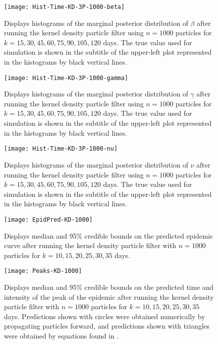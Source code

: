 \documentclass{article}
\begin{document}
\begin{figure}[ht]
\texttt{[image: Hist-Time-KD-3P-1000-beta]}
\caption{Displays histograms of the marginal posterior distribution of $\beta$ after running the kernel density particle filter using $n = 1000$ particles for $k = 15,30,45,60,75,90,105,120$ days.  The true value used for simulation is shown in the subtitle of the upper-left plot represented in the histograms by black vertical lines.} \label{fig:histbeta}
\end{figure}

\begin{figure}[ht]
\texttt{[image: Hist-Time-KD-3P-1000-gamma]}
\caption{Displays histograms of the marginal posterior distribution of $\gamma$ after running the kernel density particle filter using $n = 1000$ particles for $k = 15,30,45,60,75,90,105,120$ days.  The true value used for simulation is shown in the subtitle of the upper-left plot represented in the histograms by black vertical lines.} \label{fig:histgamma}
\end{figure}

\begin{figure}[ht]
\texttt{[image: Hist-Time-KD-3P-1000-nu]}
\caption{Displays histograms of the marginal posterior distribution of $\nu$ after running the kernel density particle filter using $n = 1000$ particles for $k = 15,30,45,60,75,90,105,120$ days.  The true value used for simulation is shown in the subtitle of the upper-left plot represented in the histograms by black vertical lines.} \label{fig:histnu}
\end{figure}

\begin{figure}[ht]
\centering
\texttt{[image: EpidPred-KD-1000]}
\caption{Displays median and 95\% credible bounds on the predicted epidemic curve after running the kernel density particle filter with $n = 1000$ particles for $k = 10,15,20,25,30,35$ days.}
\label{fig:pred}
\end{figure}

\begin{figure}[ht]
\centering
\texttt{[image: Peaks-KD-1000]}
\caption{Displays median and 95\% credible bounds on the predicted time and intensity of the peak of the epidemic after running the kernel density particle filter with $n = 1000$ particles for $k = 10,15,20,25,30,35$ days.  Predictions shown with circles were obtained numerically by propagating particles forward, and predictions shown with triangles were obtained by equations found in \citet{skvortsov2012monitoring}.}
\end{figure}
\end{document}
